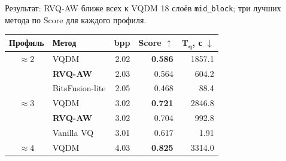 \documentclass[aspectratio=169,10pt]{beamer}
\newcommand{\midblock}{\texttt{mid\_block}}
\newcommand{\rvq}{\textbf{RVQ-AW}}
\begin{document}
%
%

\begin{frame}[t]{Результат: RVQ-AW ближе всех к VQDM}
  {\small
    18 слоёв \midblock;
    три лучших метода по Score для каждого профиля.
  }

  \vspace{1mm}

  \begin{center}
    \small
    \renewcommand{\arraystretch}{1.03}
    \setlength{\tabcolsep}{5mm}

    \begin{tabular}{clrrr}
      \toprule

      \textbf{Профиль}
        & \textbf{Метод}
        & \textbf{bpp}
        & \textbf{Score $\uparrow$}
        & $\boldsymbol{T_q}$\textbf{, с $\downarrow$} \\

      \midrule

      $\approx 2$
        & VQDM
        & 2.02
        & \textbf{0.586}
        & 1857.1 \\

      \rowcolor{Tint}
        & \rvq
        & 2.03
        & 0.564
        & 604.2 \\

        & BitsFusion-lite
        & 2.05
        & 0.468
        & 88.4 \\

      \midrule

      $\approx 3$
        & VQDM
        & 3.02
        & \textbf{0.721}
        & 2846.8 \\

      \rowcolor{Tint}
        & \rvq
        & 3.02
        & 0.704
        & 992.8 \\

        & Vanilla VQ
        & 3.01
        & 0.617
        & 1.91 \\

      \midrule

      $\approx 4$
        & VQDM
        & 4.03
        & \textbf{0.825}
        & 3314.0 \\


\end{tabular}
\end{center}
\end{frame}
\end{document}
